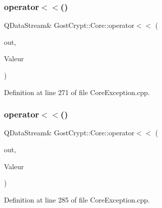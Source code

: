 \subsubsection{\texorpdfstring{operator$<$$<$()}{operator<<()}\hspace{0.1cm}{\footnotesize\ttfamily [52/56]}}
{\footnotesize\ttfamily Q\+Data\+Stream\& Gost\+Crypt\+::\+Core\+::operator$<$$<$ (\begin{DoxyParamCaption}\item[{Q\+Data\+Stream \&}]{out,  }\item[{const \hyperlink{class_gost_crypt_1_1_core_1_1_fail_find_filesystem_type}{Gost\+Crypt\+::\+Core\+::\+Fail\+Find\+Filesystem\+Type} \&}]{Valeur }\end{DoxyParamCaption})}



Definition at line 271 of file Core\+Exception.\+cpp.

\mbox{\label{namespace_gost_crypt_1_1_core_a703b460220aa13a9f8e795109f73820c}} 
\subsubsection{\texorpdfstring{operator$<$$<$()}{operator<<()}\hspace{0.1cm}{\footnotesize\ttfamily [53/56]}}
{\footnotesize\ttfamily Q\+Data\+Stream\& Gost\+Crypt\+::\+Core\+::operator$<$$<$ (\begin{DoxyParamCaption}\item[{Q\+Data\+Stream \&}]{out,  }\item[{const \hyperlink{class_gost_crypt_1_1_core_1_1_random_number_generator_not_running}{Gost\+Crypt\+::\+Core\+::\+Random\+Number\+Generator\+Not\+Running} \&}]{Valeur }\end{DoxyParamCaption})}



Definition at line 285 of file Core\+Exception.\+cpp.

\mbox{\label{namespace_gost_crypt_1_1_core_ad49d1c4727f8e8c331c80dfb55f3a364}} 
